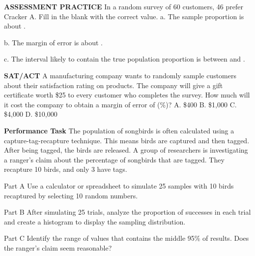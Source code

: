 \documentclass{article}
\newenvironment{practice}[2]{}{}        %
\newcommand{\answer}[1]{}               %
\newcommand{\placeholder}[2]{}          %
\begin{document}
\begin{practice}{21}{1}
\textbf{ASSESSMENT PRACTICE} In a random survey of 60 customers, 46 prefer Cracker A. Fill in the blank with the correct value.
a. The sample proportion is about \underline{\hspace{1cm}}.
\answer{a. 77\%}
b. The margin of error is about \underline{\hspace{1cm}}.
\answer{b. (\pm13\%)}
c. The interval likely to contain the true population proportion is between \underline{\hspace{1cm}} and \underline{\hspace{1cm}}.
\answer{c. 64\% and 90\%}
\end{practice}
\begin{practice}{22}{2}
\textbf{SAT/ACT} A manufacturing company wants to randomly sample customers about their satisfaction rating on products. The company will give a gift certificate worth \$25 to every customer who completes the survey. How much will it cost the company to obtain a margin of error of (\%)?
A. \$400
B. \$1,000
C. \$4,000
D. \$10,000
\answer{D}
\end{practice}
\begin{practice}{23}{2}
\textbf{Performance Task} The population of songbirds is often calculated using a capture-tag-recapture technique. This means birds are captured and then tagged. After being tagged, the birds are released. A group of researchers is investigating a ranger's claim about the percentage of songbirds that are tagged. They recapture 10 birds, and only 3 have tags.
\placeholder{illustration}{Orange-breasted songbird with gray wings, perched on a brown branch against a turquoise square. A small identification band is shown on a leg. Callout: In one forest, a ranger claims that 50 percent of songbirds are tagged.}
Part A Use a calculator or spreadsheet to simulate 25 samples with 10 birds recaptured by selecting 10 random numbers.
\answer{Part A Check students' work.}
Part B After simulating 25 trials, analyze the proportion of successes in each trial and create a histogram to display the sampling distribution.
\answer{Part B Check students' work.}
Part C Identify the range of values that contains the middle 95\% of results. Does the ranger's claim seem reasonable?
\answer{Part C Check students' work.}
\end{practice}
\end{document}
